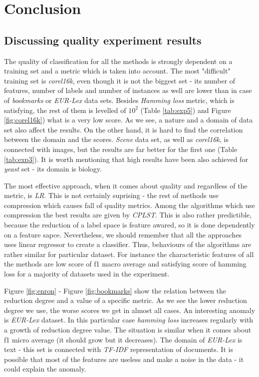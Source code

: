 \chapter{Conclusion}

\section{Discussing quality experiment results}

The quality of classification for all the methods is strongly dependent on a training set and a metric which is taken into account. The most "difficult" training set is \textit{corel16k}, even though it is not the biggest set - its number of features, number of labels and number of instances as well are lower than in case of \textit{bookmarks} or \textit{EUR-Lex} data sets. Besides \textit{Hamming loss} metric, which is satisfying, the rest of them is levelled of $10^2$ (Table \ref{tab:exp5}) and Figure \ref{fig:corel16k}) what is a very low score. As we see, a nature and a domain of data set also affect the results. On the other hand, it is hard to find the correlation between the domain and the scores. \textit{Scene} data set, as well as \textit{corel16k}, is connected with images, but the results are far better for the first one (Table \ref{tab:exp3}). It is worth mentioning that high results have been also achieved for \textit{yeast} set - its domain is biology.

The most effective approach, when it comes about quality and regardless of the metric, is \textit{LR}. This is not certainly suprising - the rest of methods use compression which causes fall of quality metrics. Among the algorithms which use compression the best results are given by \textit{CPLST}. This is also rather predictible, because the reduction of a label space is feature awared, so it is done dependently on a feature sapce. Nevertheless, we should remember that all the approaches uses linear regressor to create a classifier. Thus, behaviours of the algorithms are rather similar for particular dataset. For instance the characteristic features of all the methods are low score of f1 macro average and satisfying score of hamming loss for a majority of datasets used in the experiment. 

Figure \ref{fig:enron} - Figure \ref{fig:bookmarks} show the relation between the reduction degree and a value of a specific metric. As we see the lower reduction degree we use, the worse scores we get in almost all cases. An interesting anomaly is \textit{EUR-Lex} dataset. In this particular case \textit{hamming loss} increases regularly with a growth of reduction degree value. The situation is similar when it comes about f1 micro average (it should grow but it decreases). The domain of \textit{EUR-Lex} is text - this set is connected with \textit{TF-IDF} representation of documents. It is possible that most of the features are useless and make a noise in the data - it could explain the anomaly.  

